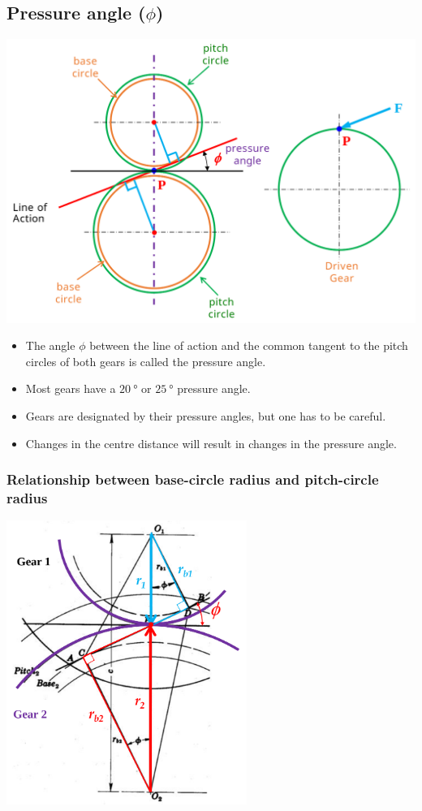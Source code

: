 \documentclass[11pt]{article}
\begin{document}
\subsection{Pressure angle (\(\phi\))}
\label{sec:orgedaae5e}
\begin{center}
\includegraphics[width=.9\linewidth]{./images/gear-contact-geometry-diagram.png}
\end{center}
\begin{itemize}
\item The angle \(\phi\) between the line of action and the common tangent to the pitch circles of both gears is called the pressure angle.
\item Most gears have a \(\qty{20}{\degree}\) or \(\qty{25}{\degree}\) pressure angle.
\item Gears are designated by their pressure angles, but one has to be careful.
\item Changes in the centre distance will result in changes in the pressure angle.
\end{itemize}
\subsubsection{Relationship between base-circle radius and pitch-circle radius}
\label{sec:org3dae253}
\begin{center}
\includegraphics[height=25em]{./images/relationship-between-base-circle-radius-and-pitch-circle-radius-diagram.png}
\end{center}
\end{document}
